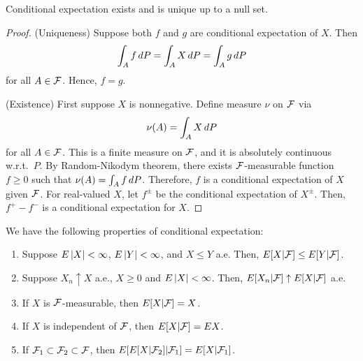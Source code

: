 \documentclass[a4paper]{article}
\begin{document}
\begin{thm}
  Conditional expectation exists and is unique up to a null set.
\end{thm}

\begin{proof}
  (Uniqueness) Suppose both $f$ and $g$ are
  conditional expectation of $X$. Then
  \[
    \int_A f \, d P = \int_A X \, d P = \int_A g \, d P
  \]
  for all $A \in \mathcal{F}$. Hence, $f = g$.

  (Existence) First suppose $X$ is nonnegative.
  Define measure $\nu$ on $\mathcal{F}$ via
  \[
    \nu (A) = \int_A X \, d P
  \]
  for all $A \in \mathcal{F}$. This is a finite measure on $\mathcal{F}$,
  and it is absolutely continuous w.r.t.\ $P$.
  By Random-Nikodym theorem, there exists $\mathcal{F}$-measurable
  function $f \geq 0$ such that $\nu (A) = \int_A f \, d P$.
  Therefore, $f$ is a conditional expectation of $X$ given $\mathcal{F}$.
  For real-valued $X$, let $f^\pm$ be the conditional expectation
  of $X^\pm$. Then, $f^+ - f^-$ is a conditional expectation for $X$.

\end{proof}

\begin{prop}
  We have the following properties of conditional expectation:
  \begin{enumerate}
    \item Suppose $E \left\lvert X\right\rvert < \infty$, $E \left\lvert Y\right\rvert < \infty$,
          and $X \leq Y$ a.e. Then, $E[X | \mathcal{F}] \leq E[Y | \mathcal{F}]$.

    \item Suppose $X_n \uparrow X$ a.e., $X \geq 0$ and
          $E \left\lvert X\right\rvert < \infty$. Then, $E [X_n | \mathcal{F}] \uparrow
            E [X | \mathcal{F}]$ a.e.

    \item If $X$ is $\mathcal{F}$-measurable, then $E [X | \mathcal{F}]
            = X$.

    \item If $X$ is independent of $\mathcal{F}$, then
          $E [X | \mathcal{F}] = E X$.

    \item If $\mathcal{F}_1 \subset \mathcal{F}_2 \subset \mathcal{F}$, then
          $E[ E[X | \mathcal{F}_2] | \mathcal{F}_1] = E [X | \mathcal{F}_1]$.

  \end{enumerate}
\end{prop}
\end{document}
